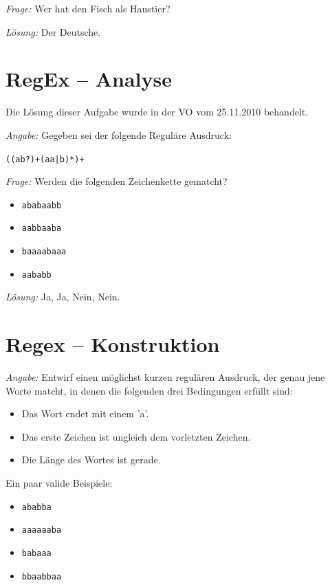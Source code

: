 \documentclass[11pt,a4paper]{article}
\theoremstyle{area}
\begin{document}
\emph{Frage:} Wer hat den Fisch als Haustier?

\emph{Lösung:} Der Deutsche.

\section{RegEx -- Analyse}

Die Lösung dieser Aufgabe wurde in der VO vom 25.11.2010 behandelt.

\emph{Angabe:} Gegeben sei der folgende Reguläre Ausdruck:

\begin{center}
  \texttt{((ab?)+(aa|b)*)+}
\end{center}

\emph{Frage:} Werden die folgenden Zeichenkette gematcht?

\begin{itemize}
  \item \texttt{ababaabb}
  \item \texttt{aabbaaba}
  \item \texttt{baaaabaaa}
  \item \texttt{aababb}
\end{itemize}

\emph{Lösung:} Ja, Ja, Nein, Nein.

\section{Regex -- Konstruktion}

\emph{Angabe:} Entwirf einen möglichst kurzen regulären Ausdruck, der genau
    jene Worte matcht, in denen die folgenden drei Bedingungen erfüllt sind:

\begin{itemize}
  \item Das Wort endet mit einem 'a'.
  \item Das erste Zeichen ist ungleich dem vorletzten Zeichen.
  \item Die Länge des Wortes ist gerade.
\end{itemize}

Ein paar valide Beispiele:

\begin{itemize}
  \item \texttt{ababba}
  \item \texttt{aaaaaaba}
  \item \texttt{babaaa}
  \item \texttt{bbaabbaa}
\end{itemize}
\end{document}
